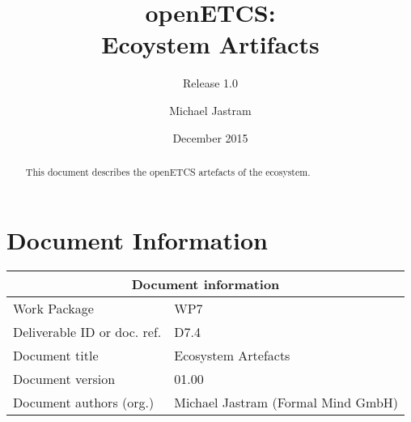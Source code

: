 \documentclass{template/openetcs_report}
\begin{document}
\frontmatter
{}




\title{openETCS:\\ Ecoystem Artifacts}

\subtitle{Release 1.0}

\date{December 2015}







\author{Michael Jastram}



\begin{abstract}
This document describes the openETCS artefacts of the ecosystem.
\end{abstract}

\maketitle
\tableofcontents

\newpage

\chapter{Document Information}
\begin{tabular}{|p{4.4cm}|p{8.7cm}|}
\hline
\multicolumn{2}{|c|}{Document information} \\
\hline
Work Package &  WP7  \\
Deliverable ID or doc. ref. & D7.4\\
\hline
Document title & Ecosystem Artefacts \\
Document version & 01.00 \\
Document authors (org.)  & Michael Jastram (Formal Mind GmbH)  \\
\hline
\end{tabular}
\end{document}
